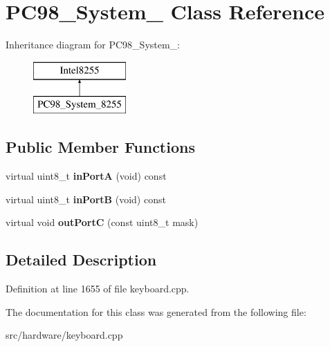 \hypertarget{classPC98__System__8255}{\section{P\-C98\-\_\-\-System\-\_ Class Reference}
\label{classPC98__System__8255}
}
Inheritance diagram for P\-C98\-\_\-\-System\-\_\-:\begin{figure}[H]
\begin{center}
\leavevmode
\includegraphics[height=2.000000cm]{classPC98__System__8255}
\end{center}
\end{figure}
\subsection*{Public Member Functions}
\begin{DoxyCompactItemize}
\item 
\hypertarget{classPC98__System__8255_a75fbaf4c6f1de6a5a4680f6e9ddfef48}{virtual uint8\-\_\-t {\bfseries in\-Port\-A} (void) const }\label{classPC98__System__8255_a75fbaf4c6f1de6a5a4680f6e9ddfef48}

\item 
\hypertarget{classPC98__System__8255_ac40439f86eb00db1563e9c8fedab3dd3}{virtual uint8\-\_\-t {\bfseries in\-Port\-B} (void) const }\label{classPC98__System__8255_ac40439f86eb00db1563e9c8fedab3dd3}

\item 
\hypertarget{classPC98__System__8255_a273039abe8a3f459c2fe5937cc145f39}{virtual void {\bfseries out\-Port\-C} (const uint8\-\_\-t mask)}\label{classPC98__System__8255_a273039abe8a3f459c2fe5937cc145f39}

\end{DoxyCompactItemize}


\subsection{Detailed Description}


Definition at line 1655 of file keyboard.\-cpp.



The documentation for this class was generated from the following file\-:\begin{DoxyCompactItemize}
\item 
src/hardware/keyboard.\-cpp\end{DoxyCompactItemize}

